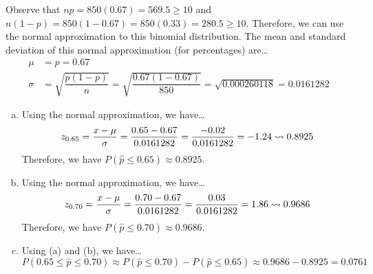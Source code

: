 \documentclass[11pt,letterpaper]{article}
\begin{document}
\sol Observe that $np= 850(0.67)= 569.5 \geq 10$ and $n(1 - p)= 850(1 - 0.67)= 850(0.33)= 280.5 \geq 10$. Therefore, we can use the normal approximation to this binomial distribution. The mean and standard deviation of this normal approximation (for percentages) are\dots
	\[
	\begin{aligned}
	\mu&= p= 0.67 \\[0.3cm]
	\sigma&= \sqrt{\dfrac{p(1 - p)}{n}}= \sqrt{\dfrac{0.67( 1 - 0.67)}{850}}= \sqrt{0.000260118}= 0.0161282
	\end{aligned}
	\] \pspace

\begin{enumerate}[(a)]
\item Using the normal approximation, we have\dots
	\[
	z_{0.65}= \dfrac{x - \mu}{\sigma}= \dfrac{0.65 - 0.67}{0.0161282}= \dfrac{-0.02}{0.0161282}= -1.24 \rightsquigarrow 0.8925
	\]
Therefore, we have $P(\widehat{p} \leq 0.65) \approx 0.8925$. \pspace

\item Using the normal approximation, we have\dots
	\[
	z_{0.70}= \dfrac{x - \mu}{\sigma}= \dfrac{0.70 - 0.67}{0.0161282}= \dfrac{0.03}{0.0161282}= 1.86 \rightsquigarrow 0.9686
	\] 
Therefore, we have $P(\widehat{p} \leq 0.70) \approx 0.9686$. \pspace

\item Using (a) and (b), we have\dots
	\[
	P(0.65 \leq \widehat{p} \leq 0.70) \approx P(\widehat{p} \leq 0.70) - P(\widehat{p} \leq 0.65) \approx 0.9686 - 0.8925= 0.0761
	\]
\end{enumerate}



\setcounter{mypagecount}{\value{page}}
\clearpage
  
\newpage

\thispagestyle{empty}
\clearpage
\setcounter{page}{\value{mypagecount}}
 
\end{document}
